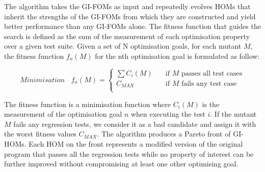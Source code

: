 \documentclass[oribibl]{llncs}
\begin{document}


The algorithm takes the GI-FOMs as input and repeatedly evolves HOMs that inherit the strengths of the GI-FOMs from which they are constructed and yield better performance than any GI-FOMs alone. The fitness function that guides the search is defined as the sum of the measurement of each optimisation property over a given test suite. Given a set of N optimisation goals, for each mutant $M$, the fitness function $f_n(M)$ for the nth optimisation goal is formulated as follow:

$$ Minimisation ~~~~f_n(M)=
\begin{cases}
    \sum C_i(M)      & \quad \text{if } M \text{ passes all test cases}\\
    C_{MAX}  & \quad \text{if } M \text{ fails any test case}\\
\end{cases}
$$


The fitness function is a minimisation function where $C_i(M)$ is the measurement of the optimisation goal $n$ when executing the test $i$. If the mutant $M$ fails any regression tests, we consider it as a bad candidate and assign it with the worst fitness values $C_{MAX}$. The algorithm produces a Pareto front of GI-HOMs. Each HOM on the front represents a modified version of the original program that passes all the regression tests while no property of interest can be further improved without compromising at least one other optimising goal.

%
%
\end{document}
